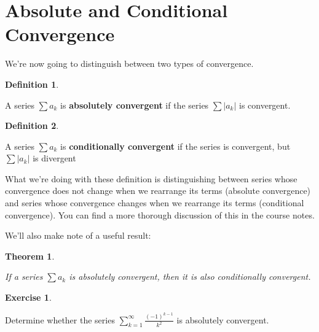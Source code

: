 \documentclass[
]{book}
\newtheorem{theorem}{Theorem}[chapter]
\theoremstyle{definition}
\newtheorem{definition}{Definition}[chapter]
\theoremstyle{definition}
\theoremstyle{definition}
\newtheorem{exercise}{Exercise}[chapter]
\theoremstyle{definition}
\theoremstyle{remark}
\begin{document}
\hypertarget{absolute-and-conditional-convergence}{%
\section{Absolute and Conditional Convergence}\label{absolute-and-conditional-convergence}}

We're now going to distinguish between two types of convergence.

\begin{definition}
\protect\hypertarget{def:unlabeled-div-220}{}\label{def:unlabeled-div-220}

A series \(\displaystyle \sum a_k\) is \textbf{absolutely convergent} if the series \(\displaystyle \sum |a_k|\) is convergent.

\end{definition}

\begin{definition}
\protect\hypertarget{def:unlabeled-div-221}{}\label{def:unlabeled-div-221}

A series \(\displaystyle \sum a_k\) is \textbf{conditionally convergent} if the series is convergent, but \(\displaystyle \sum |a_k|\) is divergent

\end{definition}

What we're doing with these definition is distinguishing between series whose convergence does not change when we rearrange its terms (absolute convergence) and series whose convergence changes when we rearrange its terms (conditional convergence). You can find a more thorough discussion of this in the course notes.

We'll also make note of a useful result:

\begin{theorem}
\protect\hypertarget{thm:unlabeled-div-222}{}\label{thm:unlabeled-div-222}

If a series \(\displaystyle \sum a_k\) is absolutely convergent, then it is also conditionally convergent.

\end{theorem}

\begin{exercise}
\protect\hypertarget{exr:unlabeled-div-223}{}\label{exr:unlabeled-div-223}

Determine whether the series \(\displaystyle \sum_{k=1}^\infty \frac{(-1)^{k-1}}{k^2}\) is absolutely convergent.

\end{exercise}
\end{document}
